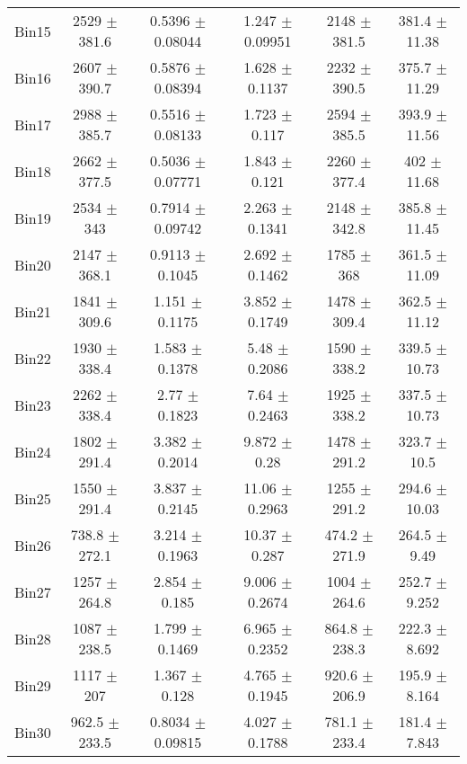\begin{tabular}{@{\extracolsep{4pt}}lccccc@{}}
     Bin15 & 2529 $\pm$ 381.6 & 0.5396 $\pm$ 0.08044 & 1.247 $\pm$ 0.09951 & 2148 $\pm$ 381.5 & 381.4 $\pm$ 11.38 \\ 
     Bin16 & 2607 $\pm$ 390.7 & 0.5876 $\pm$ 0.08394 & 1.628 $\pm$ 0.1137 & 2232 $\pm$ 390.5 & 375.7 $\pm$ 11.29 \\ 
     Bin17 & 2988 $\pm$ 385.7 & 0.5516 $\pm$ 0.08133 & 1.723 $\pm$ 0.117 & 2594 $\pm$ 385.5 & 393.9 $\pm$ 11.56 \\ 
     Bin18 & 2662 $\pm$ 377.5 & 0.5036 $\pm$ 0.07771 & 1.843 $\pm$ 0.121 & 2260 $\pm$ 377.4 & 402 $\pm$ 11.68 \\ 
     Bin19 & 2534 $\pm$ 343 & 0.7914 $\pm$ 0.09742 & 2.263 $\pm$ 0.1341 & 2148 $\pm$ 342.8 & 385.8 $\pm$ 11.45 \\ 
     Bin20 & 2147 $\pm$ 368.1 & 0.9113 $\pm$ 0.1045 & 2.692 $\pm$ 0.1462 & 1785 $\pm$ 368 & 361.5 $\pm$ 11.09 \\ 
     Bin21 & 1841 $\pm$ 309.6 & 1.151 $\pm$ 0.1175 & 3.852 $\pm$ 0.1749 & 1478 $\pm$ 309.4 & 362.5 $\pm$ 11.12 \\ 
     Bin22 & 1930 $\pm$ 338.4 & 1.583 $\pm$ 0.1378 & 5.48 $\pm$ 0.2086 & 1590 $\pm$ 338.2 & 339.5 $\pm$ 10.73 \\ 
     Bin23 & 2262 $\pm$ 338.4 & 2.77 $\pm$ 0.1823 & 7.64 $\pm$ 0.2463 & 1925 $\pm$ 338.2 & 337.5 $\pm$ 10.73 \\ 
     Bin24 & 1802 $\pm$ 291.4 & 3.382 $\pm$ 0.2014 & 9.872 $\pm$ 0.28 & 1478 $\pm$ 291.2 & 323.7 $\pm$ 10.5 \\ 
     Bin25 & 1550 $\pm$ 291.4 & 3.837 $\pm$ 0.2145 & 11.06 $\pm$ 0.2963 & 1255 $\pm$ 291.2 & 294.6 $\pm$ 10.03 \\ 
     Bin26 & 738.8 $\pm$ 272.1 & 3.214 $\pm$ 0.1963 & 10.37 $\pm$ 0.287 & 474.2 $\pm$ 271.9 & 264.5 $\pm$ 9.49 \\ 
     Bin27 & 1257 $\pm$ 264.8 & 2.854 $\pm$ 0.185 & 9.006 $\pm$ 0.2674 & 1004 $\pm$ 264.6 & 252.7 $\pm$ 9.252 \\ 
     Bin28 & 1087 $\pm$ 238.5 & 1.799 $\pm$ 0.1469 & 6.965 $\pm$ 0.2352 & 864.8 $\pm$ 238.3 & 222.3 $\pm$ 8.692 \\ 
     Bin29 & 1117 $\pm$ 207 & 1.367 $\pm$ 0.128 & 4.765 $\pm$ 0.1945 & 920.6 $\pm$ 206.9 & 195.9 $\pm$ 8.164 \\ 
     Bin30 & 962.5 $\pm$ 233.5 & 0.8034 $\pm$ 0.09815 & 4.027 $\pm$ 0.1788 & 781.1 $\pm$ 233.4 & 181.4 $\pm$ 7.843 \\ 
\hline\hline
  \end{tabular}
